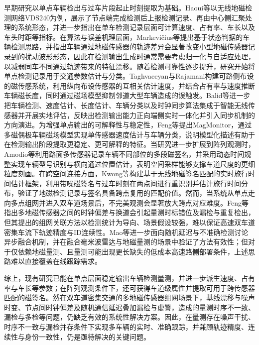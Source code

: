 \documentclass{xdupgthesis}
\begin{document}
早期研究以单点车辆检出与过车片段起止时刻提取为基础。Haoui等以无线地磁检测网络VDS240为例，展示了节点端完成检测后上报检测记录、再由中心侧汇聚处理的系统形态，并进一步指出在单车检测记录层面可计算速度、占有率、车长以及车头时距等指标\cite{haoui2008wirelessmagnetic}。在算法与误差机理层面，Markevičius等提出基于状态判据的车辆检测思路，并指出车辆通过地磁传感器的轨迹差异会显著改变小型地磁传感器记录到的扰动波形形态，因此在检测输出生成时通常需要考虑归一化与自适应处理，以减弱同车不同通过轨迹带来的特征漂移\cite{markevicius2016dynamic}。随着检测可靠性逐步提升，研究开始将单点检测记录用于交通参数估计与分类。Taghvaeeyan与Rajamani构建可路侧布设的磁传感系统，利用纵向布设传感器的互相关估计速度，并结合占有率与速度推断车辆磁长度，同时通过磁场模型抑制邻道大型车辆造成的误触发\cite{taghvaeeyan2014portable}。Balid等进一步把车辆检测、速度估计、长度估计、车辆分类以及时钟同步算法集成于智能无线传感器并开展实地评估，反映出检测输出能力正向端侧实时一体化并引入同步机制的方向演进\cite{balid2018intelligent}。为增强单点输出的可解释性与稳定性，Feng等提出MagMonitor，通过多磁偶极车辆磁场模型实现单传感器速度估计与车辆分类，说明模型化描述有助于在检测输出阶段提取更稳定、更可解释的特征\cite{feng2022magmonitor}。当研究进一步扩展到阵列观测时，Amodio等利用路面多传感器记录车辆不同部位的多段磁签名，并采用动态时间规整实现车辆型号识别与横向通过位置估计，表明空间采样能够支撑车道尺度的更细粒度刻画\cite{amodio2021vehiclemodel}。在跨空间连接方面，Kwong等构建基于无线地磁签名匹配的实时旅行时间估计框架，利用带噪磁签名与过车时刻在两点间进行重识别并估计旅行时间分布，验证了地磁检测记录与签名具备跨点复用的匹配价值\cite{kwong2009arterialtravel}。然而，当系统从单点走向多点组网并进入双车道场景后，不完美观测会显著放大跨点对应难度。Feng等指出多地磁传感器之间的时钟偏差与换道会引起量测时标错位及漏检与重复检出，但其提出的组网关联方法以检测统计为导向、场景假设较强，难以保证高速双车道密集车流下轨迹精度与ID连续性\cite{feng2021magneticdataassociation}。Mao等进一步面向随机延迟与不准确检测讨论异步融合机制，并在融合毫米波雷达与地磁量测的场景中验证了方法有效性；但对于仅依赖地磁量测、且量测可能出现更长缺失的低成本高速路侧部署条件，上述思路难以直接覆盖在线跟踪需求\cite{mao2025asynchronousfusion}。

综上，现有研究已能在单点层面稳定输出车辆检测量测，并进一步派生速度、占有率与车长等参数；在阵列观测条件下，还可获得车道级属性并提取可用于跨传感器匹配的磁签名。然在双车道密集交通的多地磁传感器组网场景下，基线漂移与噪声时变、节点间时钟偏差及随机通信延迟叠加漏检与虚警，造成的量测时序不一致、漏检与多检等问题，仍缺乏有效的系统性解决方案。因此，在量测存在噪声干扰、时序不一致与漏检并存条件下实现多车辆的实时、准确跟踪，并兼顾轨迹精度、连续性与身份一致性，仍是亟待解决的关键问题。
\end{document}
